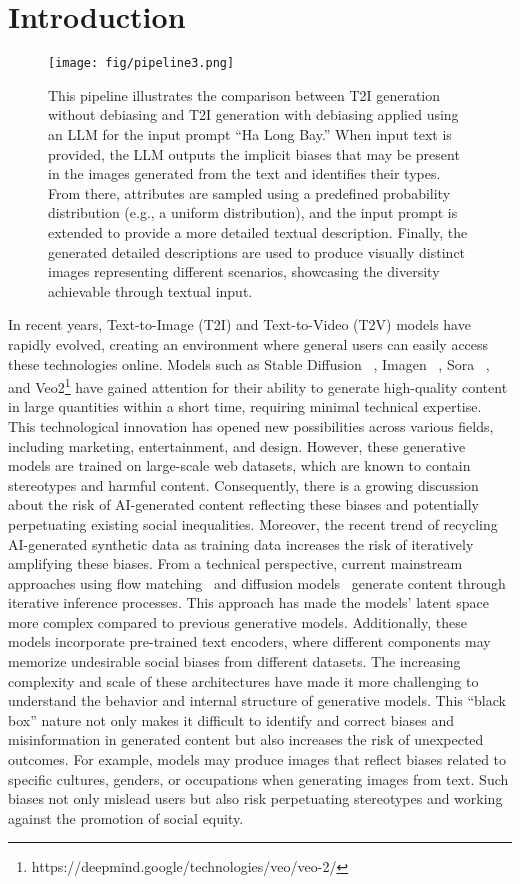 \section{Introduction}

\begin{figure*}[th]
    \centering
    \texttt{[image: fig/pipeline3.png]}
    \caption{This pipeline illustrates the comparison between T2I generation without debiasing and T2I generation with debiasing applied using an LLM for the input prompt ``Ha Long Bay.'' When input text is provided, the LLM outputs the implicit biases that may be present in the images generated from the text and identifies their types. From there, attributes are sampled using a predefined probability distribution (e.g., a uniform distribution), and the input prompt is extended to provide a more detailed textual description. Finally, the generated detailed descriptions are used to produce visually distinct images representing different scenarios, showcasing the diversity achievable through textual input.}
    \label{fig:pipeline}
\end{figure*}

In recent years, Text-to-Image (T2I) and Text-to-Video (T2V) models have rapidly evolved, creating an environment where general users can easily access these technologies online. Models such as Stable Diffusion ~\cite{sd3,sdxl}, Imagen ~\cite{imagen3}, Sora ~\cite{sora}, and Veo2\footnote{https://deepmind.google/technologies/veo/veo-2/} have gained attention for their ability to generate high-quality content in large quantities within a short time, requiring minimal technical expertise. This technological innovation has opened new possibilities across various fields, including marketing, entertainment, and design. However, these generative models are trained on large-scale web datasets, which are known to contain stereotypes and harmful content. Consequently, there is a growing discussion about the risk of AI-generated content reflecting these biases and potentially perpetuating existing social inequalities. Moreover, the recent trend of recycling AI-generated synthetic data as training data increases the risk of iteratively amplifying these biases. From a technical perspective, current mainstream approaches using flow matching~\cite{Lipman_2022, Xingchao_2022} and diffusion models~\cite{sohl2015deep,ddpm} generate content through iterative inference processes. This approach has made the models' latent space more complex compared to previous generative models. Additionally, these models incorporate pre-trained text encoders, where different components may memorize undesirable social biases from different datasets. The increasing complexity and scale of these architectures have made it more challenging to understand the behavior and internal structure of generative models. This ``black box'' nature not only makes it difficult to identify and correct biases and misinformation in generated content but also increases the risk of unexpected outcomes. 
For example, models may produce images that reflect biases related to specific cultures, genders, or occupations when generating images from text. 
Such biases not only mislead users but also risk perpetuating stereotypes and working against the promotion of social equity.

